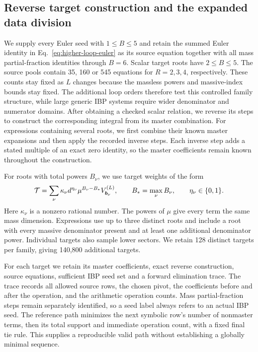 \subsection{Reverse target construction and the expanded data division}
We supply every Euler seed with $1\leq B\leq5$ and retain the
summed Euler identity in Eq.~\eqref{eq:higher-loop-euler} as its
source equation together with all mass partial-fraction identities
through $B=6$. Scalar target roots have $2\leq B\leq5$.
The source pools contain 35, 160 or 545 equations for $R=2,3,4$,
respectively. These counts stay fixed as $L$ changes because the
massless powers and massive-index bounds stay fixed. The additional
loop orders therefore test this controlled family structure, while
large generic IBP systems require wider denominator and numerator
domains.
After obtaining a checked scalar relation, we reverse its steps to
construct the corresponding integral from its master combination.
For expressions containing several roots, we first combine their
known master expansions and then apply the recorded inverse steps.
Each inverse step adds a stated multiple of an exact zero identity,
so the master coefficients remain known throughout the construction.

For roots with total powers $B_\nu$, we use target weights of the form
\begin{equation}
 {\cal T}=\sum_\nu
   \kappa_\nu d^{\eta_\nu}\mu^{B_\nu-B_*}
                       V^{(L)}_{\boldsymbol b_\nu},
 \qquad
 B_*=\max_\nu B_\nu,\qquad \eta_\nu\in\{0,1\}.
 \label{eq:higher-loop-target-weights}
\end{equation}
Here $\kappa_\nu$ is a nonzero rational number. The powers of $\mu$
give every term the same mass dimension. Expressions use up to three
distinct roots and include a root with every massive denominator
present and at least one additional denominator power. Individual
targets also sample lower sectors. We retain 128 distinct targets
per family, giving 140,800 additional targets.

For each target we retain its master coefficients, exact reverse
construction, source equations, sufficient IBP seed set and a
forward elimination trace. The trace records all allowed source
rows, the chosen pivot, the coefficients before and after the
operation, and the arithmetic operation counts. Mass
partial-fraction steps remain separately identified, so a seed label
always refers to an actual IBP seed. The reference path minimizes
the next symbolic row's number of nonmaster terms, then its total
support and immediate operation count, with a fixed final tie rule.
This supplies a reproducible valid path without establishing a
globally minimal sequence.

